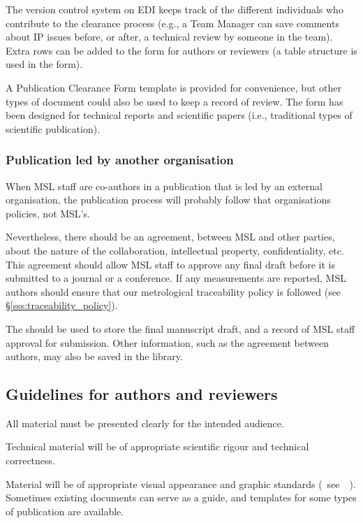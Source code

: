 The version control system on EDI keeps track of the different individuals who contribute to the clearance process (e.g., a Team Manager can save comments about IP issues before, or after, a technical review by someone in the team). Extra rows can be added to the form for authors or reviewers (a table structure is used in the form).

A Publication Clearance Form template is provided for convenience, but other types of document could also be used to keep a record of review. The form has been designed for technical reports and scientific papers (i.e., traditional types of scientific publication).  

\subsubsection{Publication led by another organisation}

When MSL staff are co-authors in a publication that is led by an external organisation, the publication process will probably follow that organisations policies, not MSL's. 

Nevertheless, there should be an agreement, between MSL and other parties, about the nature of the collaboration, intellectual property, confidentiality, etc. This agreement should allow MSL staff to approve any final draft before it is submitted to a journal or a conference. If any measurements are reported, MSL authors should ensure that our metrological traceability policy is followed (see \S\ref{sss:traceability_policy}).

The  should be used to store the final manuscript draft, and a record of MSL staff approval for submission. Other information, such as the agreement between authors, may also be saved in the library. 

\subsection{Guidelines for authors and reviewers}
All material must be presented clearly for the intended audience.

Technical material will be of appropriate scientific rigour and technical correctness. 

Material will be of appropriate visual appearance and graphic standards (~see~\cite[\S\ref*{GRP-s:scientific_documents}]{MSL_Reporting_Guidelines}~). Sometimes existing documents can serve as a guide, and templates for some types of publication are available.  

